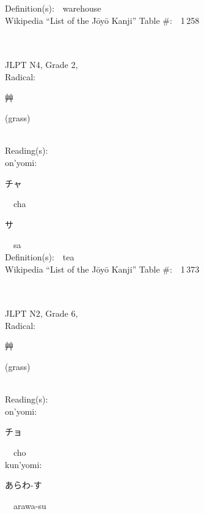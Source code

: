 \begin{multicols}{2}
Definition(s):\ \ warehouse \\
Wikipedia ``List of the J\=oy\=o Kanji'' Table \#:\ \ 1\,258 \\
\ \ \\
{\fontsize{34pt}{40pt}  }\ \ \\  %
{JLPT N4, Grade 2, \\Radical:\ \ {\begin{CJK}{UTF8}{min} 艸 \end{CJK}} (grass) } \\
Reading(s):\ \ \\
{\hspace*{1em}}on'yomi:\ \ \\
{\hspace*{2em}}{\begin{CJK}{UTF8}{min} チャ \end{CJK}}\ \ cha\ \ \\
{\hspace*{2em}}{\begin{CJK}{UTF8}{min} サ \end{CJK}}\ \ sa\ \ \\
Definition(s):\ \ tea \\
Wikipedia ``List of the J\=oy\=o Kanji'' Table \#:\ \ 1\,373 \\
\ \ \\
{\fontsize{34pt}{40pt}  }\ \ \\  %
{JLPT N2, Grade 6, \\Radical:\ \ {\begin{CJK}{UTF8}{min} 艸 \end{CJK}} (grass) } \\
Reading(s):\ \ \\
{\hspace*{1em}}on'yomi:\ \ \\
{\hspace*{2em}}{\begin{CJK}{UTF8}{min} チョ \end{CJK}}\ \ cho\ \ \\
{\hspace*{1em}}kun'yomi:\ \ \\
{\hspace*{2em}}{\begin{CJK}{UTF8}{min} あらわ-す \end{CJK}}\ \ arawa-su\ \ \\

\end{multicols}
